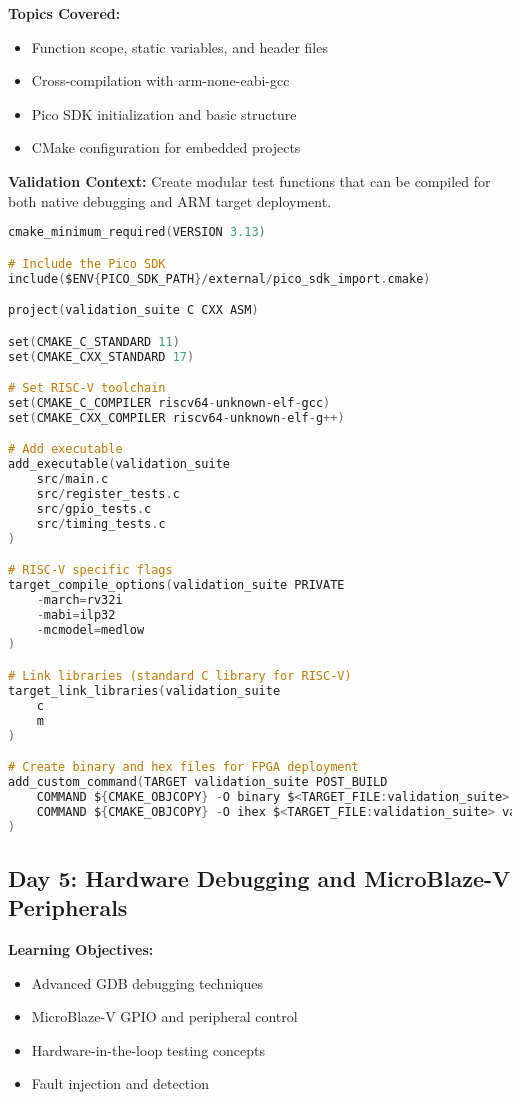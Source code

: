 \documentclass[11pt,a4paper]{article}
\begin{document}
\textbf{Topics Covered:}
\begin{itemize}
    \item Function scope, static variables, and header files
    \item Cross-compilation with arm-none-eabi-gcc
    \item Pico SDK initialization and basic structure
    \item CMake configuration for embedded projects
\end{itemize}

\textbf{Validation Context:}
Create modular test functions that can be compiled for both native debugging and ARM target deployment.

\begin{lstlisting}[language=C, caption=Day 4 Example: CMakeLists.txt for Pico]
cmake_minimum_required(VERSION 3.13)

# Include the Pico SDK
include($ENV{PICO_SDK_PATH}/external/pico_sdk_import.cmake)

project(validation_suite C CXX ASM)

set(CMAKE_C_STANDARD 11)
set(CMAKE_CXX_STANDARD 17)

# Set RISC-V toolchain
set(CMAKE_C_COMPILER riscv64-unknown-elf-gcc)
set(CMAKE_CXX_COMPILER riscv64-unknown-elf-g++)

# Add executable
add_executable(validation_suite
    src/main.c
    src/register_tests.c
    src/gpio_tests.c
    src/timing_tests.c
)

# RISC-V specific flags
target_compile_options(validation_suite PRIVATE
    -march=rv32i
    -mabi=ilp32
    -mcmodel=medlow
)

# Link libraries (standard C library for RISC-V)
target_link_libraries(validation_suite
    c
    m
)

# Create binary and hex files for FPGA deployment
add_custom_command(TARGET validation_suite POST_BUILD
    COMMAND ${CMAKE_OBJCOPY} -O binary $<TARGET_FILE:validation_suite> validation_suite.bin
    COMMAND ${CMAKE_OBJCOPY} -O ihex $<TARGET_FILE:validation_suite> validation_suite.hex
)
\end{lstlisting}

\subsection{Day 5: Hardware Debugging and MicroBlaze-V Peripherals}

\textbf{Learning Objectives:}
\begin{itemize}
    \item Advanced GDB debugging techniques
    \item MicroBlaze-V GPIO and peripheral control
    \item Hardware-in-the-loop testing concepts
    \item Fault injection and detection
\end{itemize}
\end{document}
